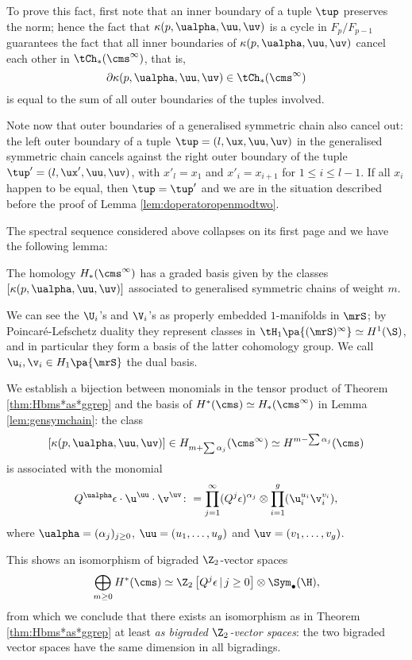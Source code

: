 To prove this fact, first note that an inner boundary of a tuple
$\tup$ preserves the norm; hence the fact that $\kappa(p,\ualpha,\uu,\uv)$ is a cycle
in $F_p/F_{p-1}$ guarantees the fact that all inner boundaries of $\kappa(p,\ualpha,\uu,\uv)$
cancel each other in $\tCh_*(\cms^{\infty})$, that is,
\[
\partial\kappa(p,\ualpha,\uu,\uv)\in \tCh_*(\cms^{\infty})
\]
is equal to the sum of all outer boundaries of the tuples involved.

Note now that outer boundaries of a generalised symmetric chain also cancel out:
the left outer boundary
of a tuple $\tup=(l,\ux,\uu,\uv)$ in the generalised symmetric chain cancels against the right outer boundary
of the tuple $\tup'=(l,\ux',\uu,\uv)$, with $x'_l=x_1$ and $x'_i=x_{i+1}$ for $1\leq i\leq l-1$. If all
$x_i$ happen to be equal, then $\tup=\tup'$ and
we are in the situation described before the proof of Lemma \ref{lem:doperatoropenmodtwo}.

The spectral sequence considered above collapses on its first page and
we have the following lemma:
\begin{lem}
\label{lem:gensymchain}
The homology $H_*(\cms^{\infty})$ has a graded basis given by the classes $[\kappa(p,\ualpha,\uu,\uv)]$
associated to generalised symmetric chains of weight $m$.
\end{lem}

\begin{defn}
 \label{defn:dualHbasis}
We can see the $\U_i$'s and $\V_i$'s as properly embedded $1$-manifolds in $\mrS$;
by Poincaré-Lefschetz duality they represent classes in $\tH_1\pa{(\mrS)^{\infty}}\simeq H^1(\S)$,
and in particular they form a basis
of the latter cohomology group. We call $\u_i,\v_i\in H_1\pa{\mrS}$ the dual basis.
\end{defn}
We establish a bijection between monomials in the tensor product of Theorem \ref{thm:Hbms*as*ggrep}
and the basis of $H^*(\cms)\simeq H_*(\cms^{\infty})$ in Lemma \ref{lem:gensymchain}:
the class 
\[
[\kappa(p,\ualpha,\uu,\uv)]\in H_{m+\sum\alpha_j}(\cms^{\infty})\simeq H^{m-\sum\alpha_j}(\cms)
\]
is associated with the monomial
\[
Q^{\ualpha}\epsilon\cdot\u^{\uu}\cdot\v^{\uv}\colon =\prod_{j=1}^{\infty}(Q^j\epsilon)^{\alpha_j}\otimes \prod_{i=1}^g(\u_i^{u_i}\v_i^{v_i}),
\]
where $\ualpha=(\alpha_j)_{j\geq 0}$, $\uu=(u_1,\dots,u_g)$ and $\uv=(v_1,\dots,v_g)$.

This shows an isomorphism of bigraded $\Z_2$-vector spaces
\begin{equation}\label{eq:isovectorspaces}
  \bigoplus_{m\geq 0} H^*(\cms)\simeq \Z_2\left[Q^j\epsilon\,|\, j\geq 0\right]\otimes\Sym_{\bullet}(\H),
\end{equation}
from which we conclude that
there exists an isomorphism as in Theorem \ref{thm:Hbms*as*ggrep}
at least \emph{as bigraded $\Z_2$-vector spaces}: the two bigraded
vector spaces have the same dimension in all bigradings.